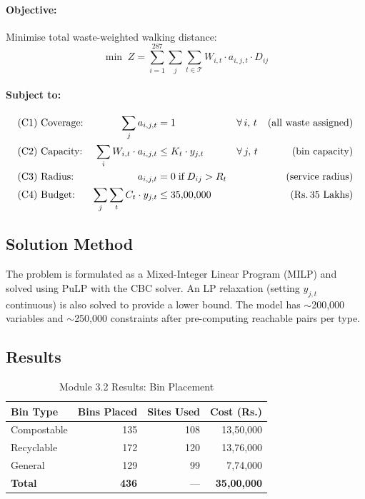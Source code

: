 \documentclass[11pt,a4paper]{article}
\begin{document}
\paragraph{Objective:} Minimise total waste-weighted walking distance:
\begin{equation}
    \min \; Z = \sum_{i=1}^{287} \sum_{j} \sum_{t \in \mathcal{T}} W_{i,t} \cdot a_{i,j,t} \cdot D_{ij}
\end{equation}

\paragraph{Subject to:}
\begin{align}
    &\text{(C1) Coverage:}    & \sum_j a_{i,j,t} &= 1 \quad &&\forall\, i,\, t & \text{(all waste assigned)} \\
    &\text{(C2) Capacity:}    & \sum_i W_{i,t} \cdot a_{i,j,t} &\le K_t \cdot y_{j,t} \quad &&\forall\, j,\, t & \text{(bin capacity)} \\
    &\text{(C3) Radius:}      & a_{i,j,t} &= 0 \;\text{if}\; D_{ij} > R_t &&& \text{(service radius)} \\
    &\text{(C4) Budget:}      & \sum_j \sum_t C_t \cdot y_{j,t} &\le 35{,}00{,}000 &&& \text{(Rs.\,35 Lakhs)}
\end{align}

\subsection{Solution Method}

The problem is formulated as a Mixed-Integer Linear Program (MILP) and solved using PuLP with the CBC solver. An LP relaxation (setting $y_{j,t}$ continuous) is also solved to provide a lower bound. The model has $\sim$200,000 variables and $\sim$250,000 constraints after pre-computing reachable pairs per type.

\subsection{Results}

\begin{table}[H]
\centering
\caption{Module 3.2 Results: Bin Placement}
\begin{tabular}{lrrr}
\toprule
\textbf{Bin Type} & \textbf{Bins Placed} & \textbf{Sites Used} & \textbf{Cost (Rs.)} \\ \midrule
Compostable & 135 & 108 & 13,50,000 \\
Recyclable  & 172 & 120 & 13,76,000 \\
General     & 129 &  99 &  7,74,000 \\
\midrule
\textbf{Total} & \textbf{436} & --- & \textbf{35,00,000} \\
\bottomrule
\end{tabular}
\end{table}
\end{document}

